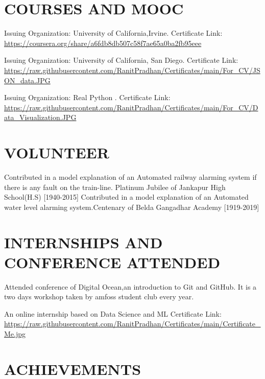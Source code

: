 \documentclass[11pt,a4paper,sans]{moderncv}        %
\begin{document}
\section{COURSES AND MOOC}
{Issuing Organization: University of California,Irvine.{\newline}
Certificate Link:
\url{ https://coursera.org/share/a6fdb8db507c58f7ae65a0ba2fb95eee}}{}

{Issuing Organization: University of California, San Diego.{\newline}
Certificate Link:
\url{https://raw.githubusercontent.com/RanitPradhan/Certificates/main/For_CV/JSON_data.JPG}}{}

{Issuing Organization: Real Python .{\newline}
Certificate Link: 
\url{https://raw.githubusercontent.com/RanitPradhan/Certificates/main/For_CV/Data_Visualization.JPG}}{}



\section{VOLUNTEER}
{Contributed in a model explanation of an Automated railway alarming system if there is any fault on the train-line. 
Platinum Jubilee of Jankapur High School(H.S) [1940-2015]}
{Contributed in a model explanation of an Automated water level alarming system.Centenary of Belda Gangadhar Academy  [1919-2019]}


\section{INTERNSHIPS AND CONFERENCE ATTENDED}
{Attended conference of Digital Ocean,an introduction to Git and GitHub. It is a two days workshop taken by amfoss student club every year.}

{An online internship based on Data Science and ML
Certificate Link: {\newline}
\url{https://raw.githubusercontent.com/RanitPradhan/Certificates/main/Certificate_Me.jpg }}{}

\section{ACHIEVEMENTS}
\end{document}

